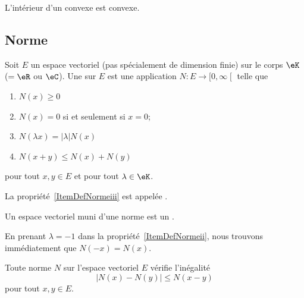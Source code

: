 \begin{lemma}		\label{LEMooEFCCooOuStrb}
	L'intérieur d'un convexe est convexe.
\end{lemma}

\ssdem

\subsection{Norme}

\begin{definition}  \label{DefNorme}
	Soit \( E\) un espace vectoriel (pas spécialement de dimension finie) sur le corps \( \eK\) (\( =\eR\) ou \( \eC\)). Une   sur \( E\) est une application \( N\colon E\to\mathopen[ 0 , \infty \mathclose[\) telle que
	\begin{enumerate}
		\item
		      \( N(x)\geq 0\)
		\item
		      \( N(x)=0\) si et seulement si \( x=0\);
		\item   \label{ItemDefNormeii}
		      \( N(\lambda x)=| \lambda |N(x)\)
		\item   \label{ItemDefNormeiii}
		      \( N(x+y)\leq N(x)+N(y)\)
	\end{enumerate}
	pour tout \( x,y\in E\) et pour tout \( \lambda\in\eK\).

	La propriété~\ref{ItemDefNormeiii} est appelée .

	Un espace vectoriel muni d'une norme est un .
\end{definition}
En prenant \( \lambda=-1\) dans la propriété~\ref{ItemDefNormeii}, nous trouvons immédiatement que \( N(-x)=N(x)\).

\begin{proposition}		\label{PropNmNNm}
	Toute norme \( N\) sur l'espace vectoriel \( E\) vérifie l'inégalité
	\begin{equation}
		\big| N(x)-N(y) \big|\leq N(x-y)
	\end{equation}
	pour tout \( x,y\in E\).
\end{proposition}

